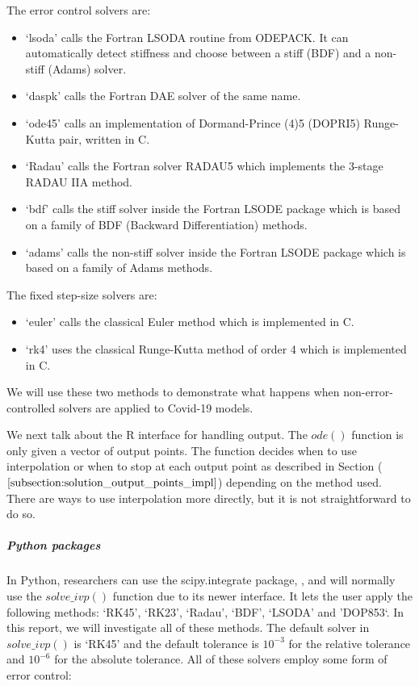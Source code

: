 The error control solvers are:
\begin{itemize}
\item `lsoda' calls the Fortran LSODA routine from ODEPACK. It can automatically detect stiffness and choose between a stiff (BDF) and a non-stiff (Adams) solver.

\item `daspk' calls the Fortran DAE solver of the same name.

\item `ode45' calls an implementation of Dormand-Prince (4)5 (DOPRI5) Runge-Kutta pair, written in C.

\item `Radau' calls the Fortran solver RADAU5 which implements the 3-stage RADAU IIA method.

\item `bdf' calls the stiff solver inside the Fortran LSODE package which is based on a family of BDF (Backward Differentiation) methods.

\item `adams' calls the non-stiff solver inside the Fortran LSODE package which is based on a family of Adams methods.
\end{itemize}

The fixed step-size solvers are:
\begin{itemize}
\item `euler' calls the classical Euler method which is implemented in C.
\item `rk4' uses the classical Runge-Kutta method of order 4 which is implemented in C. 
\end{itemize}

We will use these two methods to demonstrate what happens when non-error-controlled solvers are applied to Covid-19 models.

We next talk about the R interface for handling output. The $ode()$ function is only given a vector of output points. The function decides when to use interpolation or when to stop at each output point as described in Section ($\ref{subsection:solution_output_points_impl}$) depending on the method used. There are ways to use interpolation more directly, but it is not straightforward to do so.

\subparagraph{Python packages}
In Python, researchers can use the scipy.integrate package, \cite{2020SciPy-NMeth}, and will normally use the $solve\_ivp()$ function due to its newer interface. It lets the user apply the following methods: `RK45', `RK23', `Radau', `BDF', `LSODA' and 'DOP853`. In this report, we will investigate all of these methods. The default solver in $solve\_ivp()$ is `RK45' and the default tolerance is $10^{-3}$ for the relative tolerance and $10^{-6}$ for the absolute tolerance. All of these solvers employ some form of error control:

